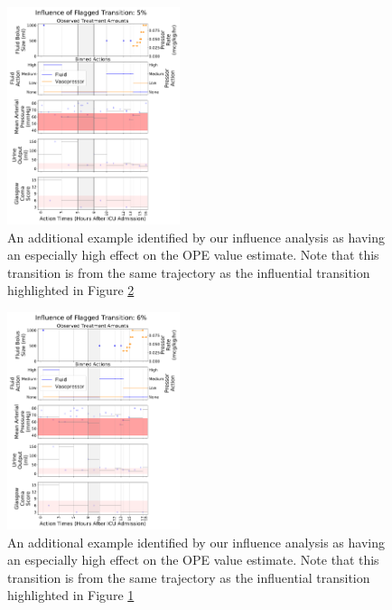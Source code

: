 \documentclass{article}
\begin{document}
\begin{figure}[H]
\centering
\includegraphics[width=0.45\textwidth]{ID-275864_trans-2.pdf}
\caption{An additional example identified by our influence analysis as having an especially high effect on the OPE value estimate. Note that this transition is from the same trajectory as the influential transition highlighted in Figure \ref{fig:mimic-3}} 
\label{fig:mimic-2}
\end{figure}

\begin{figure}[H]
\centering
\includegraphics[width=0.45\textwidth]{ID-275864_trans-3.pdf}
\caption{An additional example identified by our influence analysis as having an especially high effect on the OPE value estimate. Note that this transition is from the same trajectory as the influential transition highlighted in Figure \ref{fig:mimic-2}} 
\label{fig:mimic-3}
\end{figure}
\end{document}
